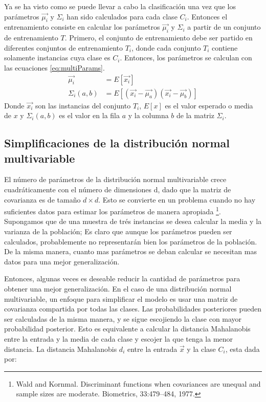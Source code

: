 \documentclass[a4paper, 11pt, oneside]{report}
\begin{document}
Ya se ha visto como se puede llevar a cabo la clasificación una vez que los parámetros $\vec{\mu_i}$ y $\Sigma_i$ han sido calculados para cada clase $C_i$. Entonces el entrenamiento consiste en calcular los parámetros $\vec{\mu_i}$ y $\Sigma_i$ a partir de un conjunto de entrenamiento $T$. Primero, el conjunto de entrenamiento debe ser partido en diferentes conjuntos de entrenamiento $T_i$, donde cada conjunto $T_i$ contiene solamente instancias cuya clase es $C_i$. Entonces, los parámetros se calculan con las ecuaciones \ref{eq:multiParams}.
\begin{equation}\label{eq:multiParams}
\begin{aligned}
	\vec{\mu_i} &= E[ \vec{x_i} ] \\
	\Sigma_i(a,b) &= E[ (\vec{x_i}-\vec{\mu_a})(\vec{x_i}-\vec{\mu_b}) ]
\end{aligned}
\end{equation}
Donde $\vec{x_i}$ son las instancias del conjunto $T_i$, $E[x]$ es el valor esperado o media de $x$ y $\Sigma_i(a,b)$ es el valor en la fila $a$ y la columna $b$ de la matriz $\Sigma_i$.

\subsection{Simplificaciones de la distribución normal multivariable}

El número de parámetros de la distribución normal multivariable crece cuadráticamente con el número de dimensiones d, dado que la matriz de covarianza es de tamaño $d \times d$. Esto se convierte en un problema cuando no hay suficientes datos para estimar los parámetros de manera apropiada \footnote{Wald and Kornmal. Discriminant functions when covariances are unequal and sample sizes are moderate. Biometrics, 33:479–484, 1977.}. Supongamos que de una muestra de trés instancias se desea calcular la media y la varianza de la población; Es claro que aunque los parámetros pueden ser calculados, probablemente no representarán bien los parámetros de la población. De la misma manera, cuanto mas parámetros se deban calcular se necesitan mas datos para una mejor generalización.

Entonces, algunas veces es deseable reducir la cantidad de parámetros para obtener una mejor generalización. En el caso de una distribución normal multivariable, un enfoque para simplificar el modelo es usar una matriz de covarianza compartida por todas las clases. Las probabilidades posteriores pueden ser calculadas de la misma manera, y se sigue escojiendo la clase con mayor probabilidad posterior. Esto es equivalente a calcular la distancia Mahalanobis entre la entrada y la media de cada clase y escojer la que tenga la menor distancia. La distancia Mahalanobis $d_i$ entre la entrada $\vec{x}$ y la clase $C_i$, esta dada por:
\end{document}
